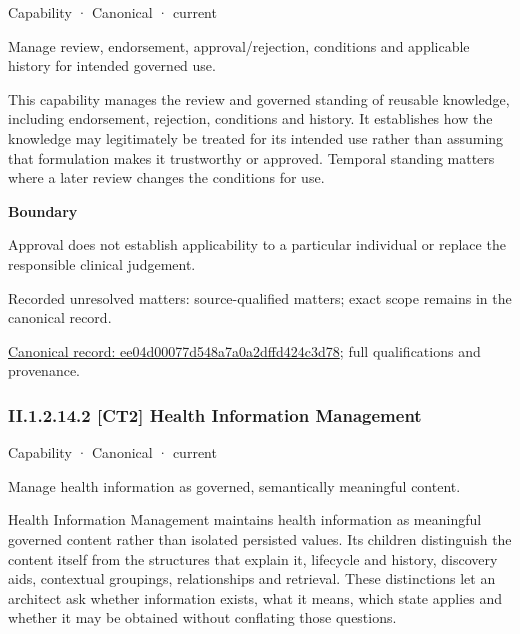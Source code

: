 \label{element:ee04d00077d548a7a0a2dffd424c3d78}
{\small Capability · Canonical · current}\par

Manage review, endorsement, approval/rejection, conditions and applicable history for intended governed use.



This capability manages the review and governed standing of reusable knowledge, including endorsement, rejection, conditions and history. It establishes how the knowledge may legitimately be treated for its intended use rather than assuming that formulation makes it trustworthy or approved. Temporal standing matters where a later review changes the conditions for use.



\textbf{Boundary}



Approval does not establish applicability to a particular individual or replace the responsible clinical judgement.


{\small Recorded unresolved matters: source-qualified matters; exact scope remains in the canonical record.}\par
{\footnotesize \href{../../../../continuum/strategy/capability/ee04d00077d548a7a0a2dffd424c3d78.md}{Canonical record: ee04d00077d548a7a0a2dffd424c3d78}; full qualifications and provenance.}\par
\subsubsection*{II.1.2.14.2 [CT2] Health Information Management}
\label{navigation:II.1.2.14.2}

\label{element:eb2984f0ca79420e83012f9e06a005fb}
{\small Capability · Canonical · current}\par

Manage health information as governed, semantically meaningful content.



Health Information Management maintains health information as meaningful governed content rather than isolated persisted values. Its children distinguish the content itself from the structures that explain it, lifecycle and history, discovery aids, contextual groupings, relationships and retrieval. These distinctions let an architect ask whether information exists, what it means, which state applies and whether it may be obtained without conflating those questions.



